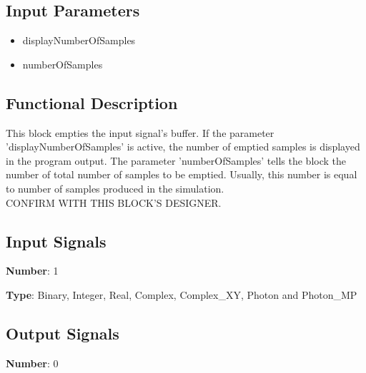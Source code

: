 \documentclass[../../sdf/tex/BPSK_system.tex]{subfiles}
\date{}
\begin{document}
\onlyinsubfile{\maketitle}

\subsection*{Input Parameters}

\begin{multicols}{2}
	\begin{itemize}
		\item displayNumberOfSamples
		\item numberOfSamples
	\end{itemize}
\end{multicols}

\subsection*{Functional Description}

This block empties the input signal's buffer. If the parameter 'displayNumberOfSamples' is active, the number of emptied samples is displayed in the program output. The parameter 'numberOfSamples' tells the block the number of total number of samples to be emptied. Usually, this number is equal to number of samples produced in the simulation.\\
CONFIRM WITH THIS BLOCK'S DESIGNER.

\subsection*{Input Signals}

\textbf{Number}: 1

\textbf{Type}:  Binary, Integer, Real, Complex, Complex\_XY, Photon and Photon_MP

\subsection*{Output Signals}

\textbf{Number}: 0
\end{document}
